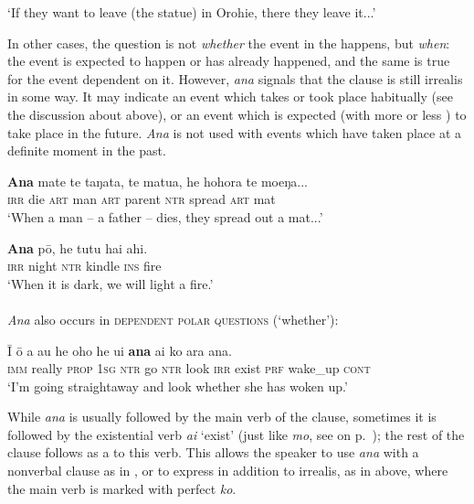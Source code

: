 \glt
‘If they want to leave (the statue) in Orohie, there they leave it...’ \textstyleExampleref{[Ley-4-06.015]}
\z

In other cases, the question is not \textit{whether} the event in the  happens, but \textit{when}: the event is expected to happen or has already happened, and the same is true for the  event dependent on it. However, \textit{ana} signals that the clause is still irrealis in some way. It may indicate an event which takes or took place habitually (see the discussion about  above), or an event which is expected (with more or less ) to take place in the future. \textit{Ana} is not used with events which have taken place at a definite moment in the past. 

\ea\label{ex:11.182}
\gll \textbf{Ana} mate te taŋata, te matu{\ꞌ}a, he hohora te moeŋa... \\
\textsc{irr} die \textsc{art} man \textsc{art} parent \textsc{ntr} spread \textsc{art} mat \\

\glt 
‘When a man – a father – dies, they spread out a mat...’ \textstyleExampleref{[Ley-4-08.001]}
\z

\ea\label{ex:11.183}
\gll \textbf{Ana} pō, he tutu hai ahi. \\
\textsc{irr} night \textsc{ntr} kindle \textsc{ins} fire \\

\glt 
‘When it is dark, we will light a fire.’ \textstyleExampleref{[R210.085]} 
\z

\paragraph{} \textit{Ana} also occurs in \textsc{dependent polar questions} (‘whether’):

\ea\label{ex:11.184}
\gll {\ꞌ}Ī {\ꞌ}ō a au he oho he u{\ꞌ}i \textbf{ana} ai ko {\ꞌ}ara {\ꞌ}ana. \\
\textsc{imm} really \textsc{prop} \textsc{1sg} \textsc{ntr} go \textsc{ntr} look \textsc{irr} exist \textsc{prf} wake\_up \textsc{cont} \\

\glt 
‘I’m going straightaway and look whether she has woken up.’ \textstyleExampleref{[R229.366]} 
\z

While \textit{ana} is usually followed by the main verb of the clause, sometimes it is followed by the existential verb \textit{ai} ‘exist’ (just like \textit{mo}, see  on p.~\pageref{ex:11.146}); the rest of the clause follows as a  to this verb. This allows the speaker to use \textit{ana} with a nonverbal clause as in , or to express  in addition to irrealis, as in  above, where the main verb is marked with perfect  \textit{ko}. 

